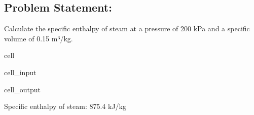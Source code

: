 \documentclass[letterpaper,10pt,english]{jupyterBook}
\begin{document}
\subsection{Problem Statement:}
\label{\detokenize{notebooks/Chapter2/Problem_4_Enthalpy_of_a_Steam:problem-statement}}
\sphinxAtStartPar
Calculate the specific enthalpy of steam at a pressure of 200 kPa and a specific volume of 0.15 m³/kg.

\begin{sphinxuseclass}{cell}\begin{sphinxVerbatimInput}

\begin{sphinxuseclass}{cell_input}
\begin{sphinxVerbatim}[commandchars=\\\{\}]

   

    
    

       

\end{sphinxVerbatim}

\end{sphinxuseclass}\end{sphinxVerbatimInput}
\begin{sphinxVerbatimOutput}

\begin{sphinxuseclass}{cell_output}
\begin{sphinxVerbatim}[commandchars=\\\{\}]
Specific enthalpy of steam: 875.4 kJ/kg
\end{sphinxVerbatim}

\end{sphinxuseclass}\end{sphinxVerbatimOutput}

\end{sphinxuseclass}
\sphinxstepscope
\end{document}

